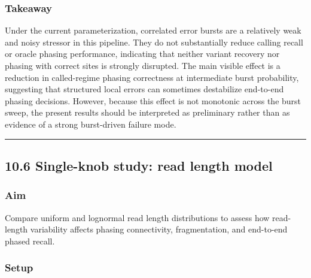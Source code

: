 \documentclass[
]{article}
\begin{document}
\subsubsection{Takeaway}\label{takeaway-3}

Under the current parameterization, correlated error bursts are a
relatively weak and noisy stressor in this pipeline. They do not
substantially reduce calling recall or oracle phasing performance,
indicating that neither variant recovery nor phasing with correct sites
is strongly disrupted. The main visible effect is a reduction in
called-regime phasing correctness at intermediate burst probability,
suggesting that structured local errors can sometimes destabilize
end-to-end phasing decisions. However, because this effect is not
monotonic across the burst sweep, the present results should be
interpreted as preliminary rather than as evidence of a strong
burst-driven failure mode.

\begin{center}\rule{0.5\linewidth}{0.5pt}\end{center}

\subsection{10.6 Single-knob study: read length
model}\label{single-knob-study-read-length-model}

\subsubsection{Aim}\label{aim-4}

Compare uniform and lognormal read length distributions to assess how
read-length variability affects phasing connectivity, fragmentation, and
end-to-end phased recall.

\subsubsection{Setup}\label{setup-4}
\end{document}
